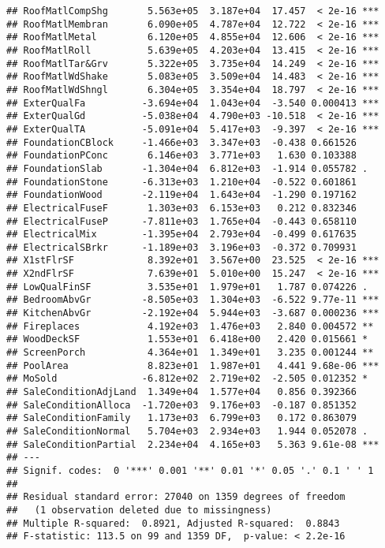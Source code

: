 \documentclass[
]{article}
\begin{document}
\begin{verbatim}
## RoofMatlCompShg       5.563e+05  3.187e+04  17.457  < 2e-16 ***
## RoofMatlMembran       6.090e+05  4.787e+04  12.722  < 2e-16 ***
## RoofMatlMetal         6.120e+05  4.855e+04  12.606  < 2e-16 ***
## RoofMatlRoll          5.639e+05  4.203e+04  13.415  < 2e-16 ***
## RoofMatlTar&Grv       5.322e+05  3.735e+04  14.249  < 2e-16 ***
## RoofMatlWdShake       5.083e+05  3.509e+04  14.483  < 2e-16 ***
## RoofMatlWdShngl       6.304e+05  3.354e+04  18.797  < 2e-16 ***
## ExterQualFa          -3.694e+04  1.043e+04  -3.540 0.000413 ***
## ExterQualGd          -5.038e+04  4.790e+03 -10.518  < 2e-16 ***
## ExterQualTA          -5.091e+04  5.417e+03  -9.397  < 2e-16 ***
## FoundationCBlock     -1.466e+03  3.347e+03  -0.438 0.661526    
## FoundationPConc       6.146e+03  3.771e+03   1.630 0.103388    
## FoundationSlab       -1.304e+04  6.812e+03  -1.914 0.055782 .  
## FoundationStone      -6.313e+03  1.210e+04  -0.522 0.601861    
## FoundationWood       -2.119e+04  1.643e+04  -1.290 0.197162    
## ElectricalFuseF       1.303e+03  6.153e+03   0.212 0.832346    
## ElectricalFuseP      -7.811e+03  1.765e+04  -0.443 0.658110    
## ElectricalMix        -1.395e+04  2.793e+04  -0.499 0.617635    
## ElectricalSBrkr      -1.189e+03  3.196e+03  -0.372 0.709931    
## X1stFlrSF             8.392e+01  3.567e+00  23.525  < 2e-16 ***
## X2ndFlrSF             7.639e+01  5.010e+00  15.247  < 2e-16 ***
## LowQualFinSF          3.535e+01  1.979e+01   1.787 0.074226 .  
## BedroomAbvGr         -8.505e+03  1.304e+03  -6.522 9.77e-11 ***
## KitchenAbvGr         -2.192e+04  5.944e+03  -3.687 0.000236 ***
## Fireplaces            4.192e+03  1.476e+03   2.840 0.004572 ** 
## WoodDeckSF            1.553e+01  6.418e+00   2.420 0.015661 *  
## ScreenPorch           4.364e+01  1.349e+01   3.235 0.001244 ** 
## PoolArea              8.823e+01  1.987e+01   4.441 9.68e-06 ***
## MoSold               -6.812e+02  2.719e+02  -2.505 0.012352 *  
## SaleConditionAdjLand  1.349e+04  1.577e+04   0.856 0.392366    
## SaleConditionAlloca  -1.720e+03  9.176e+03  -0.187 0.851352    
## SaleConditionFamily   1.173e+03  6.799e+03   0.172 0.863079    
## SaleConditionNormal   5.704e+03  2.934e+03   1.944 0.052078 .  
## SaleConditionPartial  2.234e+04  4.165e+03   5.363 9.61e-08 ***
## ---
## Signif. codes:  0 '***' 0.001 '**' 0.01 '*' 0.05 '.' 0.1 ' ' 1
## 
## Residual standard error: 27040 on 1359 degrees of freedom
##   (1 observation deleted due to missingness)
## Multiple R-squared:  0.8921, Adjusted R-squared:  0.8843 
## F-statistic: 113.5 on 99 and 1359 DF,  p-value: < 2.2e-16
\end{verbatim}
\end{document}
